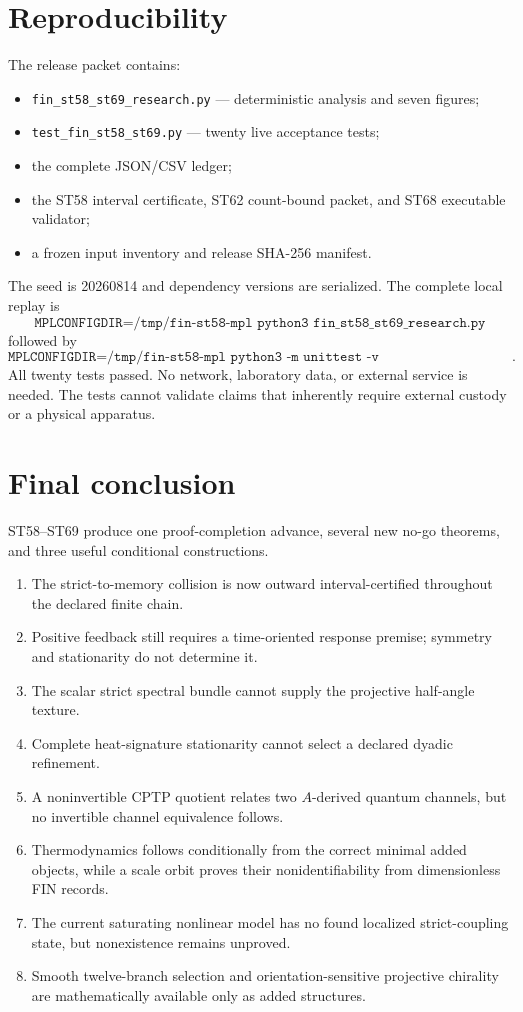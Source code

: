 \documentclass[11pt,a4paper]{article}
\begin{document}
\section{Reproducibility}

The release packet contains:
\begin{itemize}
\item \texttt{fin\_st58\_st69\_research.py} --- deterministic analysis and seven figures;
\item \texttt{test\_fin\_st58\_st69.py} --- twenty live acceptance tests;
\item the complete JSON/CSV ledger;
\item the ST58 interval certificate, ST62 count-bound packet, and ST68 executable validator;
\item a frozen input inventory and release SHA-256 manifest.
\end{itemize}

The seed is 20260814 and dependency versions are serialized. The complete local replay is
\[
\texttt{MPLCONFIGDIR=/tmp/fin-st58-mpl python3 fin\_st58\_st69\_research.py}
\]
followed by
\[
\texttt{MPLCONFIGDIR=/tmp/fin-st58-mpl python3 -m unittest -v test\_fin\_st58\_st69.py}.
\]
All twenty tests passed. No network, laboratory data, or external service is needed. The tests cannot validate claims that inherently require external custody or a physical apparatus.

\section{Final conclusion}

ST58--ST69 produce one proof-completion advance, several new no-go theorems, and three useful conditional constructions.

\begin{enumerate}
\item The strict-to-memory collision is now outward interval-certified throughout the declared finite chain.
\item Positive feedback still requires a time-oriented response premise; symmetry and stationarity do not determine it.
\item The scalar strict spectral bundle cannot supply the projective half-angle texture.
\item Complete heat-signature stationarity cannot select a declared dyadic refinement.
\item A noninvertible CPTP quotient relates two $A$-derived quantum channels, but no invertible channel equivalence follows.
\item Thermodynamics follows conditionally from the correct minimal added objects, while a scale orbit proves their nonidentifiability from dimensionless FIN records.
\item The current saturating nonlinear model has no found localized strict-coupling state, but nonexistence remains unproved.
\item Smooth twelve-branch selection and orientation-sensitive projective chirality are mathematically available only as added structures.
\end{enumerate}
\end{document}
